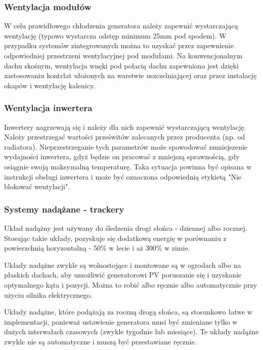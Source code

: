 \documentclass[12pt,a4paper]{article}
\begin{document}
 

\subsubsection{Wentylacja modułów }

W celu prawidłowego chłodzenia generatora należy zapewnić wystarczającą 
wentylację (typowo wystarcza odstęp minimum 25mm pod spodem). W 
przypadku systemów zintegrowanych można to uzyskać przez zapewnienie 
odpowiedniej przestrzeni wentylacyjnej pod modułami. Na konwencjonalnym 
dachu skośnym, wentylacja wnęki pod połacią dachu zapewniona jest dzięki 
zastosowaniu kontrłat ułożonych na warstwie uszczelniającej oraz przez 
instalację okapów i wentylację kalenicy. 

 

\subsubsection{Wentylacja inwertera }


Inwertery nagrzewają się i należy dla nich zapewnić wystarczającą 
wentylację. Należy przestrzegać wartości prześwitów zalecanych przez 
producenta (np. od radiatora). Nieprzestrzeganie tych parametrów może 
spowodować zmniejszenie wydajności inwertera, gdyż będzie on pracować z 
mniejszą sprawnością, gdy osiągnie swoją maksymalną temperaturę. Taka 
sytuacja powinna być opisana w instrukcji obsługi inwertera i może być 
oznaczona odpowiednią etykietą "Nie blokować wentylacji". 

 

\subsubsection{Systemy nadążane - trackery }


Układ nadążny jest używany do śledzenia drogi słońca - dziennej albo 
rocznej. Stosując takie układy, pozyskuje się dodatkową energię w 
porównaniu z powierzchnią horyzontalną - 50\% w lecie i aż 300\% w 
zimie. 

 

Układy nadążne zwykle są wolnostojące i montowane są w ogrodach albo na 
płaskich dachach, aby umożliwić generatorowi PV poruszanie się i 
uzyskanie optymalnego kąta i pozycji. Można to robić albo ręcznie albo 
automatycznie przy użyciu silnika elektrycznego. 

 

Układy nadążne, które podążają za roczną drogą słońca, są stosunkowo 
łatwe w implementacji, ponieważ ustawienie generatora musi być zmieniane 
tylko w dużych interwałach czasowych (zwykle tygodnie lub miesiące). Te 
układy nadążne zwykle nie są automatyczne i muszą być przestawiane 
ręcznie. 
\end{document}
